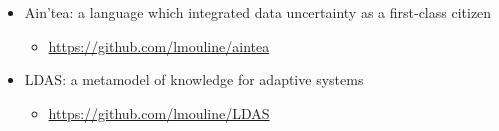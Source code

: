 \begin{itemize}
	\item Ain'tea: a language which integrated data uncertainty as a first-class citizen
	\begin{itemize}
		\item \url{https://github.com/lmouline/aintea}
	\end{itemize}
	\item LDAS: a \gls{metamodel} of knowledge for adaptive systems
	\begin{itemize}
		\item \url{https://github.com/lmouline/LDAS}
	\end{itemize}
\end{itemize}